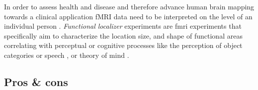 %
In order to assess health and disease and therefore advance human brain mapping
towards a clinical application fMRI data need to be interpreted on the level of
an individual person \citep{dubois2016building, wegrzyn2018thought}.
%
\textit{Functional localizer} experiments \citep[e.g.,][for
reviews]{saxe2006divide, friston2006critique} are \ac{fmri} experiments that
specifically aim to characterize the location size, and shape of functional
areas correlating with perceptual or cognitive processes like the perception of
object categories \citep{kanwisher1997ffa} or speech
\citep{fernandez2001language}, or theory of mind \citep{spunt2014validating}.


\subsection{Pros \& cons}


